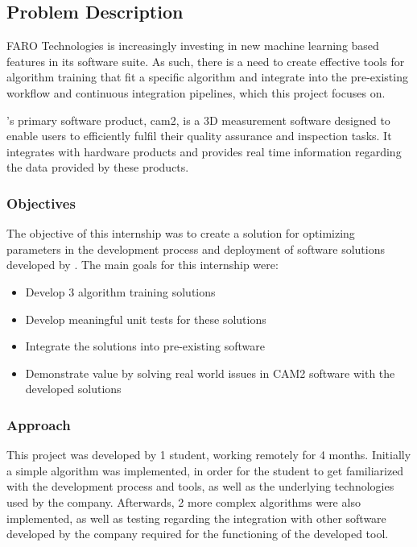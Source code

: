 
\subsection{Problem Description}

FARO Technologies\textsuperscript{\textregistered} is increasingly investing in new machine learning based features in its software suite. As such, there is a need to create effective tools for algorithm training that fit a specific algorithm and integrate into the pre-existing workflow and continuous integration pipelines, which this project focuses on.

\faro's primary software product, \acrshort{cam2}, is a 3D measurement software designed to enable users to efficiently fulfil their quality assurance and inspection tasks. It integrates with \faro hardware products and provides real time information regarding the data provided by these products.

\subsubsection{Objectives}

The objective of this internship was to create a solution for optimizing parameters in the development process and deployment of software solutions developed by \faro. The main goals for this internship were:

\begin{itemize}
	\item Develop 3 algorithm training solutions
	\item Develop meaningful unit tests for these solutions
	\item Integrate the solutions into pre-existing software
	\item Demonstrate value by solving real world issues in CAM2\textsuperscript{\textregistered} software with the developed solutions
\end{itemize}

\subsubsection{Approach}

This project was developed by 1 student, working remotely for 4 months. Initially a simple algorithm was implemented, in order for the student to get familiarized with the development process and tools, as well as the underlying technologies used by the company. Afterwards, 2 more complex algorithms were also implemented, as well as testing regarding the integration with other software developed by the company required for the functioning of the developed tool.

